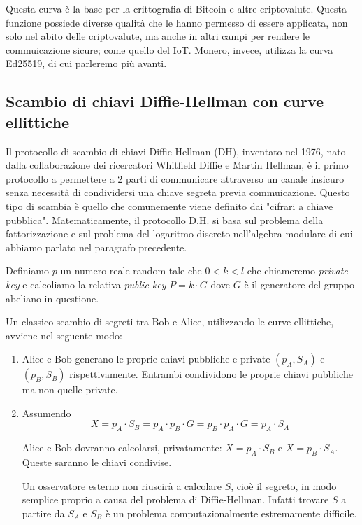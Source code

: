 \documentclass[12pt,a4paper]{article}
\begin{document}
Questa curva è la base per la crittografia di Bitcoin e altre criptovalute.
Questa funzione possiede diverse qualità che le hanno permesso di essere
applicata, non solo nel abito delle criptovalute, ma anche in altri campi per
rendere le commuicazione sicure; come quello del IoT. Monero, invece, utilizza
la curva Ed25519, di cui parleremo più avanti.

\subsection{Scambio di chiavi Diffie-Hellman con curve ellittiche}
Il protocollo di scambio di chiavi Diffie-Hellman (DH), inventato nel 1976, nato
dalla collaborazione dei ricercatori Whitfield Diffie e Martin Hellman, è il
primo protocollo a permettere a 2 parti di communicare attraverso un canale
insicuro senza necessità di condividersi una chiave segreta previa
commuicazione. Questo tipo di scambia è quello che comunemente viene definito dai "cifrari a chiave pubblica".
Matematicamente, il protocollo D.H. si basa sul problema della fattorizzazione e
sul problema del logaritmo discreto nell'algebra modulare di cui abbiamo parlato nel paragrafo precedente.

Definiamo $ p $ un numero reale random tale che $0 < k < l$ che chiameremo
\textit{private key} e calcoliamo la relativa \textit{public key} $ P = k \cdot
G $ dove $ G $ è il generatore del gruppo abeliano in questione.

Un classico scambio di segreti tra Bob e Alice, utilizzando le curve ellittiche,
avviene nel seguente modo:

\begin{enumerate}
    \item Alice e Bob generano le proprie chiavi pubbliche e private $ (p_A,
    S_A) $ e $ (p_B, S_B) $ rispettivamente. Entrambi condividono le proprie
    chiavi pubbliche ma non quelle private.
    \item Assumendo
        $$ X = p_A \cdot S_B = p_A \cdot p_B \cdot G = p_B \cdot p_A \cdot G =
        p_A \cdot S_A $$

        Alice e Bob dovranno calcolarsi, privatamente: $ X = p_A \cdot S_B $ e $
        X = p_B \cdot S_A $. Queste saranno le chiavi condivise.

        Un osservatore esterno non riuscirà a calcolare $ S $, cioè il segreto,
        in modo semplice proprio a causa del problema di Diffie-Hellman. Infatti
        trovare $ S $ a partire da $ S_A $ e $ S_B $ è un problema
        computazionalmente estremamente difficile.
\end{enumerate}
\end{document}
